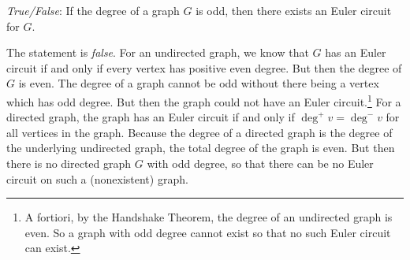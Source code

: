 \documentclass[11pt,letterpaper]{article}
\begin{document}
\quizsol \textit{True/False}: If the degree of a graph $G$ is odd, then there exists an Euler circuit for $G$. \pspace

\sol The statement is \textit{false}. For an undirected graph, we know that $G$ has an Euler circuit if and only if every vertex has positive even degree. But then the degree of $G$ is even. The degree of a graph cannot be odd without there being a vertex which has odd degree. But then the graph could not have an Euler circuit.\footnote{A fortiori, by the Handshake Theorem, the degree of an undirected graph is even. So a graph with odd degree cannot exist so that no such Euler circuit can exist.} For a directed graph, the graph has an Euler circuit if and only if $\deg^+ v= \deg^- v$ for all vertices in the graph. Because the degree of a directed graph is the degree of the underlying undirected graph, the total degree of the graph is even. But then there is no directed graph $G$ with odd degree, so that there can be no Euler circuit on such a (nonexistent) graph. 
\end{document}
